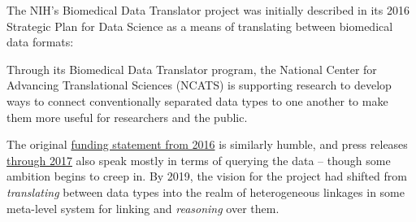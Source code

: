 The NIH's Biomedical Data Translator
project was initially described in its 2016 Strategic Plan for Data
Science as a means of translating between biomedical data formats:

\begin{leftbar}
Through its Biomedical Data Translator program, the National Center for
Advancing Translational Sciences (NCATS) is supporting research to
develop ways to connect conventionally separated data types to one
another to make them more useful for researchers and the public. \cite{nationalinstitutesofhealthNIHStrategicPlan2018} 
\end{leftbar}

The original
\href{https://web.archive.org/web/20210709100523/https://ncats.nih.gov/news/releases/2016/feasibility-assessment-translator}{funding
statement from 2016} is similarly humble, and press releases
\href{https://web.archive.org/web/20210709171335/https://ncats.nih.gov/pubs/features/translator}{through
2017} also speak mostly in terms of querying the data -- though some
ambition begins to creep in. By 2019, the vision for the project had
shifted from \emph{translating} between data types into the realm of
heterogeneous linkages in some meta-level system for linking and
\emph{reasoning} over them.

